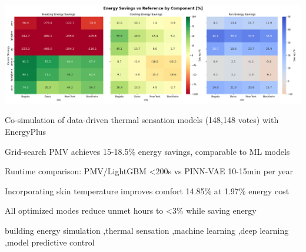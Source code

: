 \documentclass[preprint,12pt]{elsarticle}
\begin{document}
\begin{frontmatter}
\begin{graphicalabstract}
\includegraphics[width=.95\linewidth]{figs/saving_end_pct.png}
\end{graphicalabstract}

\begin{highlights}
\item Co-simulation of data-driven thermal sensation models (148,148 votes) with EnergyPlus
\item Grid-search PMV achieves 15-18.5\% energy savings, comparable to ML models
\item Runtime comparison: PMV/LightGBM <200s vs PINN-VAE 10-15min per year
\item Incorporating skin temperature improves comfort 14.85\% at 1.97\% energy cost
\item All optimized modes reduce unmet hours to <3\% while saving energy
\end{highlights}

\begin{keyword}
building energy simulation \sep thermal sensation \sep machine learning \sep deep learning \sep model predictive control
\end{keyword}

\end{frontmatter}
















\end{document}
